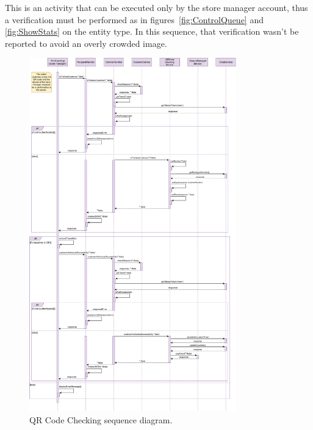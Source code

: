 This is an activity that can be executed only by the store manager account, thus a verification must be performed as in figures~\ref{fig:ControlQueue} and \ref{fig:ShowStats} on the entity type. In this sequence, that verification wasn't be reported to avoid an overly crowded image.

\begin{figure}[H]
    \centering
    \includegraphics[width=0.8\textwidth]{images/qrCodeChecking_sequence_diagram.pdf}
    \caption{QR Code Checking sequence diagram.}\label{fig:QRCodeChecking}
\end{figure}


